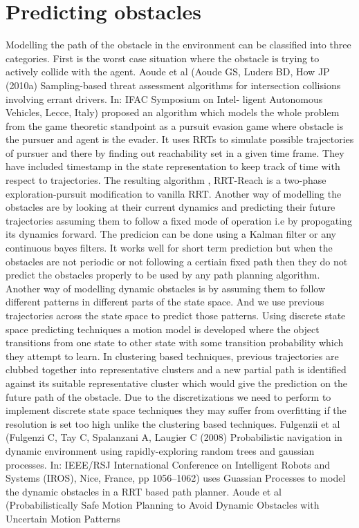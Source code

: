 \documentclass[MTech]{iitmdiss}
\begin{document}
\section{Predicting obstacles} 

Modelling the path of the obstacle in the environment can be classified into three categories. First is the worst case situation where the obstacle is trying to actively collide with the agent. Aoude et al (Aoude GS, Luders BD, How JP (2010a) Sampling-based threat assessment algorithms for intersection collisions involving errant drivers. In: IFAC Symposium on Intel- ligent Autonomous Vehicles, Lecce, Italy) proposed an algorithm which models the whole problem from the game theoretic standpoint as a pursuit evasion game where obstacle is the pursuer and agent is the evader. It uses RRTs to simulate possible trajectories of pursuer and there by finding out reachability set in a given time frame. They have included timestamp in the state representation to keep track of time with respect to trajectories. The resulting algorithm , RRT-Reach is a two-phase exploration-pursuit modification to vanilla RRT. Another way of modelling the obstacles are by looking at their current dynamics and predicting their future trajectories assuming them to follow a fixed mode of operation i.e by propogating its dynamics forward. The predicion can be done using a Kalman filter or any continuous bayes filters. It works well for short term prediction but when the obstacles are not periodic or not following a certiain fixed path then they do not predict the obstacles properly to be used by any path planning algorithm. Another way of modelling dynamic obstacles is by assuming them to follow different patterns in different parts of the state space. And we use previous trajectories across the state space to predict those patterns. Using discrete state space predicting techniques a motion model is developed where the object transitions from one state to other state with some transition probability which they attempt to learn. In clustering based techniques, previous trajectories are clubbed together into representative clusters and a new partial path is identified against its suitable representative cluster which would give the prediction on the future path of the obstacle. Due to the discretizations we need to perform to implement discrete state space techniques they may suffer from overfitting if the resolution is set too high unlike the clustering based techniques. Fulgenzii et al (Fulgenzi C, Tay C, Spalanzani A, Laugier C (2008) Probabilistic navigation in dynamic environment using rapidly-exploring random trees and gaussian processes. In: IEEE/RSJ International Conference on Intelligent Robots and Systems (IROS), Nice, France, pp 1056–1062) uses Guassian Processes to model the dynamic obstacles in a RRT based path planner. Aoude et al (Probabilistically Safe Motion Planning to Avoid Dynamic Obstacles with Uncertain Motion Patterns
\end{document}
